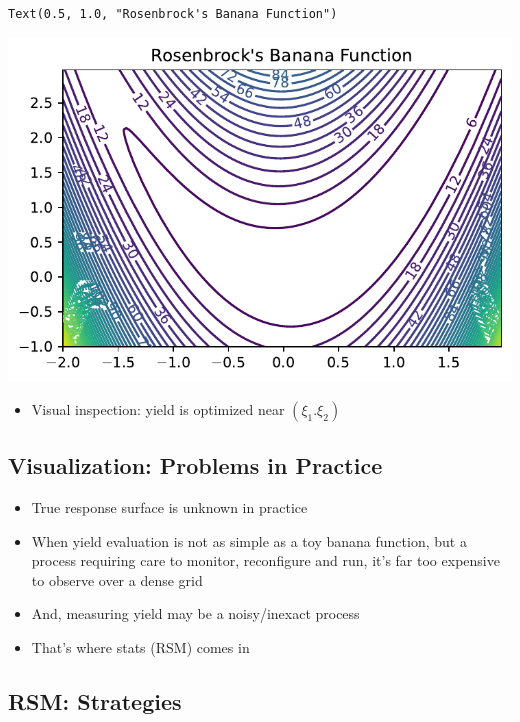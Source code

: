 \documentclass[
  letterpaper,
  DIV=11,
  numbers=noendperiod]{scrreprt}
\providecommand{\tightlist}{%
  \setlength{\itemsep}{0pt}\setlength{\parskip}{0pt}}\usepackage{longtable,booktabs,array}
\begin{document}
\begin{verbatim}
Text(0.5, 1.0, "Rosenbrock's Banana Function")
\end{verbatim}

\includegraphics{005_num_rsm_files/figure-pdf/cell-3-output-2.pdf}

\begin{itemize}
\tightlist
\item
  Visual inspection: yield is optimized near \((\xi_1. \xi_2)\)
\end{itemize}

\subsection{Visualization: Problems in
Practice}\label{visualization-problems-in-practice}

\begin{itemize}
\tightlist
\item
  True response surface is unknown in practice
\item
  When yield evaluation is not as simple as a toy banana function, but a
  process requiring care to monitor, reconfigure and run, it's far too
  expensive to observe over a dense grid
\item
  And, measuring yield may be a noisy/inexact process
\item
  That's where stats (RSM) comes in
\end{itemize}

\subsection{RSM: Strategies}\label{rsm-strategies}
\end{document}
